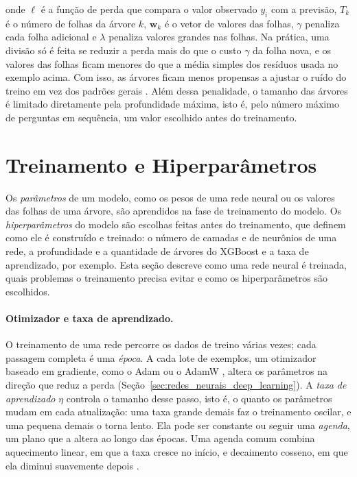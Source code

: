 \noindent onde \(\ell\) é a função de perda que compara o valor observado \(y_i\) com a previsão, \(T_k\) é o número de folhas da árvore \(k\), \(\mathbf{w}_k\) é o vetor de valores das folhas, \(\gamma\) penaliza cada folha adicional e \(\lambda\) penaliza valores grandes nas folhas. Na prática, uma divisão só é feita se reduzir a perda mais do que o custo \(\gamma\) da folha nova, e os valores das folhas ficam menores do que a média simples dos resíduos usada no exemplo acima. Com isso, as árvores ficam menos propensas a ajustar o ruído do treino em vez dos padrões gerais \cite{chen2016xgboost}. Além dessa penalidade, o tamanho das árvores é limitado diretamente pela profundidade máxima, isto é, pelo número máximo de perguntas em sequência, um valor escolhido antes do treinamento.

\section{Treinamento e Hiperparâmetros}
\label{sec:otimizacao_hpo}

Os \emph{parâmetros} de um modelo, como os pesos de uma rede neural ou os valores das folhas de uma árvore, são aprendidos na fase de treinamento do modelo. Os \emph{hiperparâmetros} do modelo são escolhas feitas antes do treinamento, que definem como ele é construído e treinado: o número de camadas e de neurônios de uma rede, a profundidade e a quantidade de árvores do XGBoost e a taxa de aprendizado, por exemplo. Esta seção descreve como uma rede neural é treinada, quais problemas o treinamento precisa evitar e como os hiperparâmetros são escolhidos.

\paragraph{Otimizador e taxa de aprendizado.} O treinamento de uma rede percorre os dados de treino várias vezes; cada passagem completa é uma \emph{época}. A cada lote de exemplos, um otimizador baseado em gradiente, como o Adam ou o AdamW \cite{kingma2014adam,loshchilov2019decoupled}, altera os parâmetros na direção que reduz a perda (Seção~\ref{sec:redes_neurais_deep_learning}). A \emph{taxa de aprendizado} \(\eta\) controla o tamanho desse passo, isto é, o quanto os parâmetros mudam em cada atualização: uma taxa grande demais faz o treinamento oscilar, e uma pequena demais o torna lento. Ela pode ser constante ou seguir uma \emph{agenda}, um plano que a altera ao longo das épocas. Uma agenda comum combina aquecimento linear, em que a taxa cresce no início, e decaimento cosseno, em que ela diminui suavemente depois \cite{goyal2017accurate,loshchilov2017sgdr}.


